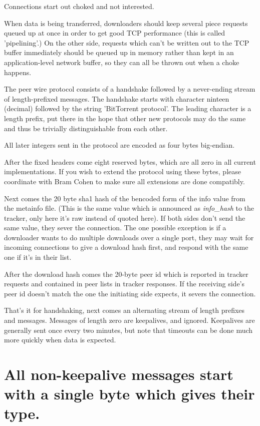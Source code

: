 \documentclass{article}
\begin{document}
Connections start out choked and not interested.

When data is being transferred, downloaders should keep several piece requests queued up at once in order to get good TCP performance (this is called 'pipelining'.) On the other side, requests which can't be written out to the TCP buffer immediately should be queued up in memory rather than kept in an application-level network buffer, so they can all be thrown out when a choke happens.

The peer wire protocol consists of a handshake followed by a never-ending stream of length-prefixed messages. The handshake starts with character ninteen (decimal) followed by the string 'BitTorrent protocol'. The leading character is a length prefix, put there in the hope that other new protocols may do the same and thus be trivially distinguishable from each other.

All later integers sent in the protocol are encoded as four bytes big-endian.

After the fixed headers come eight reserved bytes, which are all zero in all current implementations. If you wish to extend the protocol using these bytes, please coordinate with Bram Cohen to make sure all extensions are done compatibly.

Next comes the 20 byte sha1 hash of the bencoded form of the info value from the metainfo file. (This is the same value which is announced as {\it info\_hash} to the tracker, only here it's raw instead of quoted here). If both sides don't send the same value, they sever the connection. The one possible exception is if a downloader wants to do multiple downloads over a single port, they may wait for incoming connections to give a download hash first, and respond with the same one if it's in their list.

After the download hash comes the 20-byte peer id which is reported in tracker requests and contained in peer lists in tracker responses. If the receiving side's peer id doesn't match the one the initiating side expects, it severs the connection.

That's it for handshaking, next comes an alternating stream of length prefixes and messages. Messages of length zero are keepalives, and ignored. Keep\-alives are generally sent once every two minutes, but note that timeouts can be done much more quickly when data is expected.

{\section {All non-keepalive messages start with a single byte which gives their type.}}
\end{document}
